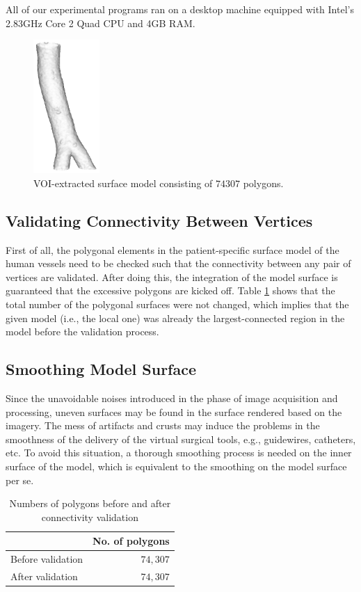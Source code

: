 All of our experimental programs ran on a desktop machine equipped with Intel's 2.83GHz Core 2 Quad CPU and 4GB RAM.

\begin{figure}[t]
\centering
\includegraphics[height=2.0in]{Figures/original2.png}
\caption{VOI-extracted surface model consisting of $74307$ polygons.}
\label{fig:VOI}
\end{figure}

\subsection{Validating Connectivity Between Vertices}

First of all, the polygonal elements in the patient-specific surface model of the human vessels need to be checked such that the connectivity between any pair of vertices are validated. %
After doing this, the integration of the model surface is guaranteed that the excessive polygons are kicked off.
Table \ref{tbl:Connectivity} shows that the total number of the polygonal surfaces were not changed, which implies that the given model (i.e., the local one) was already the largest-connected region in the model before the validation process. %

\subsection{Smoothing Model Surface}

Since the unavoidable noises introduced in the phase of image acquisition and processing, uneven surfaces may be found in the surface rendered based on the imagery.
The mess of artifacts and crusts may induce the problems in the smoothness of the delivery of the virtual surgical tools, e.g., guidewires, catheters, etc.
To avoid this situation, a thorough smoothing process is needed on the inner surface of the model, which is equivalent to the smoothing on the model surface per se.
\begin{table}[t]
\renewcommand{\arraystretch}{1.3}
\caption{Numbers of polygons before and after connectivity validation}
\label{tbl:Connectivity}
\centering
\begin{tabular}
{@{}l||r@{}}
\hline
~                       & No. of polygons \\
\hline\hline
Before validation       & $74,307$  \\
After validation        & $74,307$  \\
\hline
\end{tabular}
\end{table}

